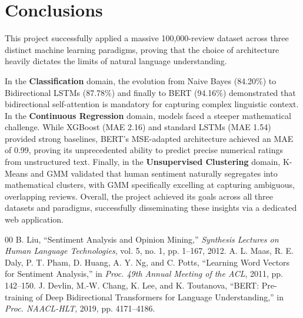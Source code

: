 \documentclass[conference]{IEEEtran}
\begin{document}
\section{Conclusions}
This project successfully applied a massive 100,000-review dataset across three distinct machine learning paradigms, proving that the choice of architecture heavily dictates the limits of natural language understanding.

In the \textbf{Classification} domain, the evolution from Naive Bayes (84.20\%) to Bidirectional LSTMs (87.78\%) and finally to BERT (94.16\%) demonstrated that bidirectional self-attention is mandatory for capturing complex linguistic context. In the \textbf{Continuous Regression} domain, models faced a steeper mathematical challenge. While XGBoost (MAE 2.16) and standard LSTMs (MAE 1.54) provided strong baselines, BERT's MSE-adapted architecture achieved an MAE of 0.99, proving its unprecedented ability to predict precise numerical ratings from unstructured text. Finally, in the \textbf{Unsupervised Clustering} domain, K-Means and GMM validated that human sentiment naturally segregates into mathematical clusters, with GMM specifically excelling at capturing ambiguous, overlapping reviews. Overall, the project achieved its goals across all three datasets and paradigms, successfully disseminating these insights via a dedicated web application.

\begin{thebibliography}{00}
 B. Liu, ``Sentiment Analysis and Opinion Mining,'' \textit{Synthesis Lectures on Human Language Technologies}, vol. 5, no. 1, pp. 1--167, 2012.
 A. L. Maas, R. E. Daly, P. T. Pham, D. Huang, A. Y. Ng, and C. Potts, ``Learning Word Vectors for Sentiment Analysis,'' in \textit{Proc. 49th Annual Meeting of the ACL}, 2011, pp. 142--150.
 J. Devlin, M.-W. Chang, K. Lee, and K. Toutanova, ``BERT: Pre-training of Deep Bidirectional Transformers for Language Understanding,'' in \textit{Proc. NAACL-HLT}, 2019, pp. 4171--4186.
\end{thebibliography}
\end{document}
